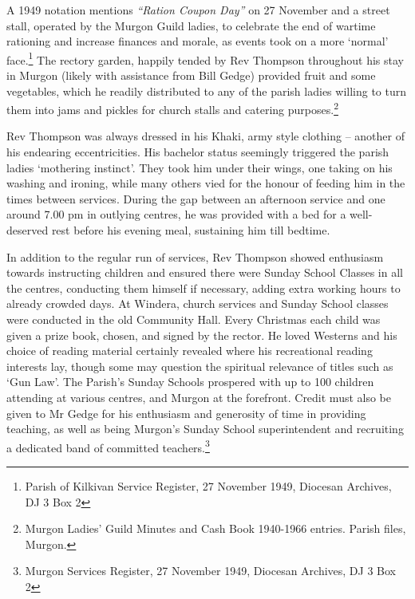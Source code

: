 A 1949 notation mentions \emph{``Ration Coupon Day''} on 27 November and a street stall, operated by the Murgon Guild ladies, to celebrate the end of wartime rationing and increase finances and morale, as events took on a more `normal' face.\footnote{Parish of Kilkivan Service Register, 27 November 1949, Diocesan Archives, DJ 3 Box 2} The rectory garden, happily tended by Rev Thompson throughout his stay in Murgon (likely with assistance from Bill Gedge) provided fruit and some vegetables, which he readily distributed to any of the parish ladies willing to turn them into jams and pickles for church stalls and catering purposes.\footnote{Murgon Ladies' Guild Minutes and Cash Book 1940-1966 entries. Parish files, Murgon.}


Rev Thompson was always dressed in his Khaki, army style clothing -- another of his endearing eccentricities. His bachelor status seemingly triggered the parish ladies `mothering instinct'. They took him under their wings, one taking on his washing and ironing, while many others vied for the honour of feeding him in the times between services. During the gap between an afternoon service and one around 7.00 pm in outlying centres, he was provided with a bed for a well-deserved rest before his evening meal, sustaining him till bedtime.



In addition to the regular run of services, Rev Thompson showed enthusiasm towards instructing children and ensured there were Sunday School Classes in all the centres, conducting them himself if necessary, adding extra working hours to already crowded days. At Windera, church services and Sunday School classes were conducted in the old Community Hall. Every Christmas each child was given a prize book, chosen, and signed by the rector. He loved Westerns and his choice of reading material certainly revealed where his recreational reading interests lay, though some may question the spiritual relevance of titles such as `Gun Law'. The Parish's Sunday Schools prospered with up to 100 children attending at various centres, and Murgon at the forefront. Credit must also be given to Mr Gedge for his enthusiasm and generosity of time in providing teaching, as well as being Murgon's Sunday School superintendent and recruiting a dedicated band of committed teachers.\footnote{Murgon Services Register, 27 November 1949, Diocesan Archives, DJ 3 Box 2}


